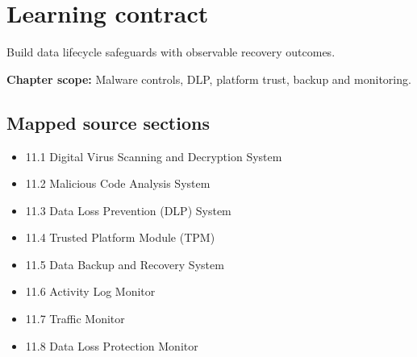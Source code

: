 \documentclass[10pt,letterpaper]{article}
\begin{document}
\sourceStatement
\tableofcontents
\newpage
\section{Learning contract}
\begin{takeaway}
Build data lifecycle safeguards with observable recovery outcomes.
\end{takeaway}
\textbf{Chapter scope:} Malware controls, DLP, platform trust, backup and monitoring.\\
\subsection{Mapped source sections}
\begin{itemize}
\item 11.1 Digital Virus Scanning and Decryption System
\item 11.2 Malicious Code Analysis System
\item 11.3 Data Loss Prevention (DLP) System
\item 11.4 Trusted Platform Module (TPM)
\item 11.5 Data Backup and Recovery System
\item 11.6 Activity Log Monitor
\item 11.7 Traffic Monitor
\item 11.8 Data Loss Protection Monitor
\end{itemize}
\end{document}
